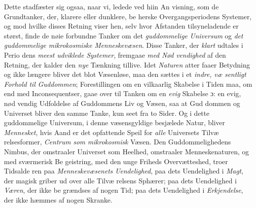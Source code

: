Dette stadfæster sig ogsaa, naar vi, ledede ved hiin An\-%
visning, som de Grundtanker, der, klarere eller dunklere, be\-%
herske Overgangsperiodens Systemer, og mod hvilke disses
Retning viser hen, selv hvor Afstanden tilsyneladende er størst,
finde de nøie forbundne Tanker om det \emph{guddommelige
Universum} og \emph{det guddommelige mikrokosmiske
Menneskevæsen}. Disse Tanker, der \emph{klart} udtales i Perio\-%
dens \emph{meest udviklede Systemer}, fremgaae \emph{med Nød\-%
vendighed} af den Retning, der kalder den \emph{nye} Tænkning
tillive. Idet \emph{Naturen} atter faaer Betydning og ikke længere
bliver det blot Væsenløse, maa den sættes i et \emph{indre, væ\-%
sentligt Forhold til Guddommen}; Forestillingen om en
vilkaarlig Skabelse i Tiden maa, om end med Inconsequentser,
gaae over til Tanken om en \emph{evig} Skabelse ɔ: en evig, nød\-%
vendig Udfoldelse af Guddommens Liv og Væsen, saa at Gud\-%
dommen og Universet bliver den samme Tanke, kun seet fra
to Sider. Og i dette guddommelige Universum, i denne
væsensgyldige besjælede Natur, bliver \emph{Mennesket}, hvis
Aand er det opfattende Speil for \emph{alle} Universets Tilvæ\-%
relsesformer, \emph{Centrum som mikrokosmisk} Væsen. Den
Guddommelighedens Nimbus, der omstraaler Universet som
Heelhed, omstraaler Menneskenaturen, og med sværmerisk Be\-%
geistring, med den unge Friheds Overvætteshed, troer Tidsalde\-%
ren paa \emph{Menneskevæsenets Uendelighed}, paa dets
 \setcounter{footnote}{0}
Uendelighed i \emph{Magt}, der magisk griber ud over alle Tilvæ\-%
relsens Sphærer; paa dets Uendelighed i \emph{Væren}, der ikke be\-%
grændses af nogen Tid; paa dets Uendelighed i \emph{Erkjendelse},
der ikke hæmmes af nogen Skranke.

